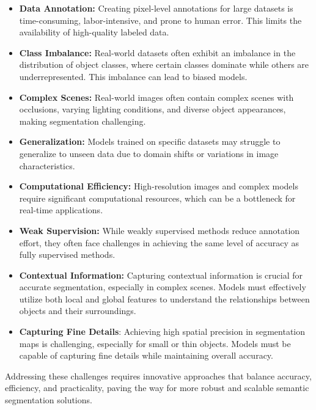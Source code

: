 \begin{itemize}
    \item \textbf{Data Annotation:} Creating pixel-level annotations for large datasets is time-consuming, labor-intensive, and prone to human error. This limits the availability of high-quality labeled data.
    \item \textbf{Class Imbalance:} Real-world datasets often exhibit an imbalance in the distribution of object classes, where certain classes dominate while others are underrepresented. This imbalance can lead to biased models.
    \item \textbf{Complex Scenes:} Real-world images often contain complex scenes with occlusions, varying lighting conditions, and diverse object appearances, making segmentation challenging.
    \item \textbf{Generalization:} Models trained on specific datasets may struggle to generalize to unseen data due to domain shifts or variations in image characteristics.
    \item \textbf{Computational Efficiency:} High-resolution images and complex models require significant computational resources, which can be a bottleneck for real-time applications.
    \item \textbf{Weak Supervision:} While weakly supervised methods reduce annotation effort, they often face challenges in achieving the same level of accuracy as fully supervised methods.
    \item \textbf{Contextual Information:} Capturing contextual information is crucial for accurate segmentation, especially in complex scenes. Models must effectively utilize both local and global features to understand the relationships between objects and their surroundings.
    \item \textbf{Capturing Fine Details}: Achieving high spatial precision in segmentation maps is challenging, especially for small or thin objects. Models must be capable of capturing fine details while maintaining overall accuracy.
\end{itemize}

Addressing these challenges requires innovative approaches that balance accuracy, efficiency, and practicality, paving the way for more robust and scalable semantic segmentation solutions.


